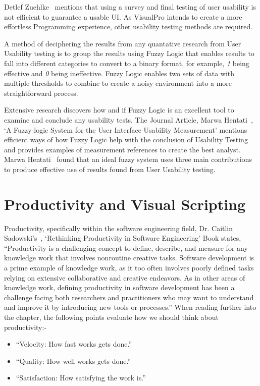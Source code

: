 \documentclass[12pt]{report} %
\begin{document}
		Detlef Zuehlke~\cite{zuehlke_useware_2008} mentions that using a survey and final testing of user usability is not efficient to guarantee a usable UI. As VisualPro intends to create a more effortless Programming experience, other usability testing methods are required.

		A method of deciphering the results from any quantative research from User Usability testing is to group the results using Fuzzy Logic that enables results to fall into different categories to convert to a binary format, for example, \textit{1} being effective and \textit{0} being ineffective. Fuzzy Logic enables two sets of data with multiple thresholds to combine to create a noisy environment into a more straightforward process.

		Extensive research discovers how and if Fuzzy Logic is an excellent tool to examine and conclude any usability tests. The Journal Article, Marwa Hentati~\cite{hentati_fuzzy-logic_2016}, `A Fuzzy-logic System for the User Interface Usability Measurement' mentions efficient ways of how Fuzzy Logic help with the conclusion of Usability Testing and provides examples of measurement references to create the best analyst. Marwa Hentati~\cite{hentati_fuzzy-logic_2016} found that an ideal fuzzy system uses three main contributions to produce effective use of results found from User Usability testing.
		
	\section{Productivity and Visual Scripting}
	\label{sec:productivityVisualScripting}
		Productivity, specifically within the software engineering field, Dr. Caitlin Sadowski's~\cite{dr_caitlin_sadowski_rethinking_2019}, `Rethinking Productivity in Software Engineering' Book states, ``Productivity is a challenging concept to define, describe, and measure for any knowledge work that involves nonroutine creative tasks. Software development is a prime example of knowledge work, as it too often involves poorly defined tasks relying on extensive collaborative and creative endeavors. As in other areas of knowledge work, defining productivity in software development has been a challenge facing both researchers and practitioners who may want to understand and improve it by introducing new tools or processes.'' When reading further into the chapter, the following points evaluate how we should think about productivity:-

		\begin{itemize}
		\item ``Velocity: How fast works gets done.''~\cite{dr_caitlin_sadowski_rethinking_2019}
		\item ``Quality: How well works gets done.''~\cite{dr_caitlin_sadowski_rethinking_2019}
		\item ``Satisfaction: How satisfying the work is.''~\cite{dr_caitlin_sadowski_rethinking_2019}
		\end{itemize}
\end{document}
